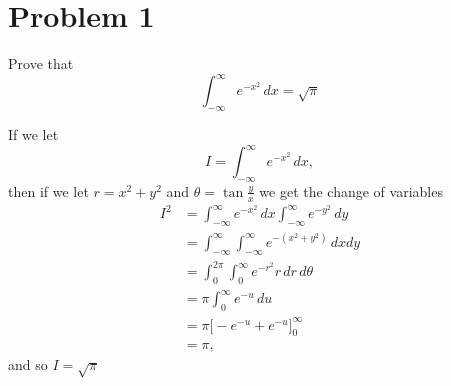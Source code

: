 \documentclass[11pt]{article}
\begin{document}
	
	\psetheader
\section*{Problem 1}
\begin{problem}
    Prove that 
    \[\int_{-\infty}^\infty e^{-x^2}\,dx= \sqrt{\pi}\]
\end{problem}
\begin{solution}
If we let 
\[I = \int_{-\infty}^\infty e^{-x^2}\,dx,\] then if we let $r= x^2 + y^2$ and $\theta = \tan \frac{y}{x}$ we get the change of variables
\begin{align*}
I^2 &= \int_{-\infty}^\infty e^{-x^2}\,dx \int_{-\infty}^\infty e^{-y^2}\,dy\\
&= \int_{-\infty}^\infty\int_{-\infty}^\infty e^{-(x^2 + y^2)}\,dxdy\\
&= \int_0^{2\pi}\int_0^\infty e^{-r^2}r\,dr\,d\theta\\
&= \pi \int_0^\infty e^{-u}\,du\\
&= \pi \bigg[-e^{-u} + e^{-u}\bigg]_0^\infty\\
&= \pi,
\end{align*}
and so $I = \sqrt{\pi}$

\end{solution}

\newpage
\end{document}
